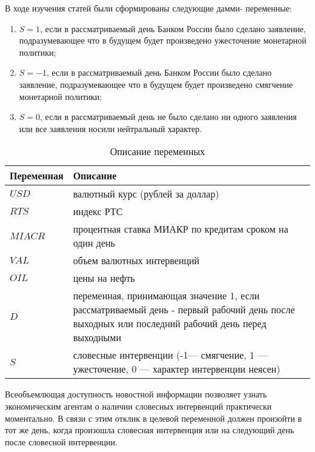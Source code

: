 \documentclass[14pt,a4paper, oneside]{extreport}
\begin{document}
В ходе изучения статей были сформированы следующие дамми-
переменные:

\begin{enumerate}
\item[] $S=1$, если в рассматриваемый день Банком России было сделано заявление, подразумевающее что в будущем будет произведено ужесточение монетарной политики;

\item[] $S=-1$, если в рассматриваемый день Банком России было сделано заявление, подразумевающее что в будущем будет произведено смягчение монетарной политики;

\item[] $S=0$, если в рассматриваемый день не было сделано ни одного заявления или все заявления носили нейтральный характер.
\end{enumerate}

\begin{table}[h]
	\begin{center}
		\caption{Описание переменных}\label{varieble}
		\begin{tabular}{|m{3cm}|m{8cm}|}
  		\hline
  		Переменная & Описание \\ \hline
    	$USD$ & валютный курс (рублей за доллар)  \\ \hline
  		$RTS$ & индекс РТС \\ \hline
  		$MIACR$ & процентная ставка МИАКР по кредитам сроком на один день \\ \hline
  		$VAL$ & объем валютных интервенций\\ \hline
  		$OIL$ & цены на нефть \\ \hline
  		$D$ & переменная, принимающая значение 1, если рассматриваемый день - первый рабочий день после выходных или последний рабочий день перед выходными \\ \hline
  		$S$ & словесные интервенции (-1--- смягчение, 1 --- ужесточение, 0 --- характер интервенции неясен) \\ \hline
		\end{tabular}
	\end{center}
\end{table}

Всеобъемлющая доступность новостной информации позволяет узнать экономическим агентам о наличии словесных интервенций практически моментально. В связи с этим отклик в целевой переменной должен произойти в тот же день, когда произошла словесная интервенция или на следующий день после словесной интервенции.
\end{document}
